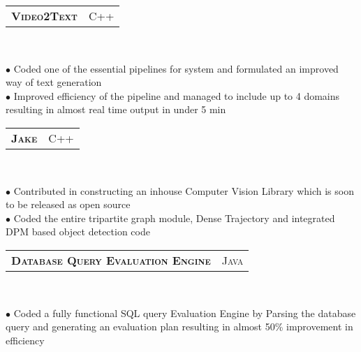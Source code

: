 \documentclass[10pt,a4paper,oneside]{article}
\begin{document}
\begin{minipage}[t]{0.63\textwidth}
\begin{adjustwidth}{7pt}{0pt}
        \end{adjustwidth}
        \begin{tabular}{c|c}
            \textbf{\normalsize V\textsc{ideo}2T\textsc{ext}}
            &\textmd{\normalsize C\textsc{++}}
        \end{tabular}\\
        \vspace{-4mm}
        \begin{adjustwidth}{7pt}{0pt}
            {\footnotesize $\bullet$ Coded one of the essential pipelines for system and formulated an improved way of text generation\\
            $\bullet$ Improved efficiency of the pipeline and managed to include up to 4 domains resulting in almost real time output in under 5 min}\\ 
        \end{adjustwidth}
        \begin{tabular}{c|c}
            \textbf{\normalsize J\textsc{ake}}
            &\textmd{\normalsize C\textsc{++}}
        \end{tabular}\\
         \vspace{-4mm}
        \begin{adjustwidth}{7pt}{0pt}
            {\footnotesize $\bullet$ Contributed in constructing an inhouse Computer Vision Library which is soon to be released as open
                source\\
            $\bullet$ Coded the entire tripartite graph module, Dense Trajectory and integrated DPM based object detection code}\\
        \end{adjustwidth}
        \begin{tabular}{c|c}
            \textbf{\normalsize D\textsc{atabase} Q\textsc{uery}
            E\textsc{valuation} E\textsc{ngine}}
            &\textmd{\normalsize J\textsc{ava}}
        \end{tabular}\\
         \vspace{-4mm}
        \begin{adjustwidth}{7pt}{0pt}
            {\footnotesize $\bullet$ Coded a fully functional SQL query Evaluation Engine by Parsing the database query and generating an evaluation plan resulting in almost 50\% improvement in efficiency}\\
        \end{adjustwidth}
   \end{minipage}
\end{document}
